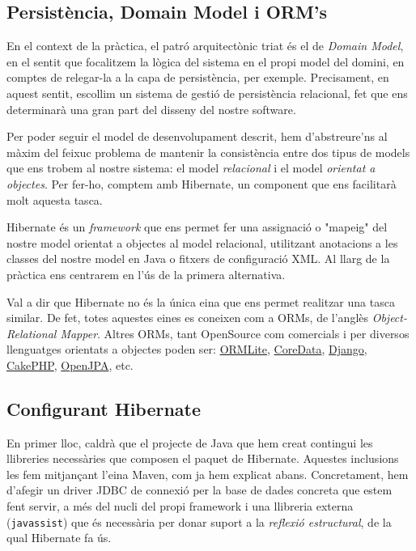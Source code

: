 \subsection{Persistència, Domain Model i ORM's}
En el context de la pràctica, el patró arquitectònic triat és el de \emph{Domain Model}, en el sentit que focalitzem la lògica del sistema en el propi model del domini, en comptes de relegar-la a la capa de persistència, per exemple. Precisament, en aquest sentit, escollim un sistema de gestió de persistència relacional, fet que ens determinarà una gran part del disseny del nostre software.

Per poder seguir el model de desenvolupament descrit, hem d'abstreure'ns al màxim del feixuc problema de mantenir la consistència entre dos tipus de models que ens trobem al nostre sistema: el model \emph{relacional} i el model \emph{orientat a objectes}. Per fer-ho, comptem amb Hibernate, un component que ens facilitarà molt aquesta tasca.

Hibernate és un \emph{framework} que ens permet fer una assignació o "mapeig" del nostre model orientat a objectes al model relacional, utilitzant anotacions a les classes del nostre model en Java o fitxers de configuració XML. Al llarg de la pràctica ens centrarem en l'ús de la primera alternativa.

Val a dir que Hibernate no és la única eina que ens permet realitzar una tasca similar. De fet, totes aquestes eines es coneixen com a ORMs, de l'anglès \emph{Object-Relational Mapper}. Altres ORMs, tant OpenSource com comercials i per diversos llenguatges orientats a objectes poden ser: \hyperlink{http://ormlite.com/}{ORMLite}, \href{https://developer.apple.com/technologies/mac/data-management.html}{CoreData}, \href{https://www.djangoproject.com/}{Django}, \href{http://cakephp.org/}{CakePHP}, \href{http://openjpa.apache.org/}{OpenJPA}, etc.

\subsection{Configurant Hibernate}
En primer lloc, caldrà que el projecte de Java que hem creat contingui les llibreries necessàries que composen el paquet de Hibernate. Aquestes inclusions les fem mitjançant l'eina Maven, com ja hem explicat abans. Concretament, hem d'afegir un driver JDBC de connexió per la base de dades concreta que estem fent servir, a més del nucli del propi framework i una llibreria externa (\texttt{javassist}) que és necessària per donar suport a la \emph{reflexió estructural}, de la qual Hibernate fa ús.

